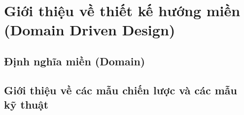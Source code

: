 \documentclass{report} %
\begin{document}
% 















% 


\section{Giới thiệu về thiết kế hướng miền (Domain Driven Design) }



\subsection{Định nghĩa miền (Domain)}

% 

\subsection{Giới thiệu về các mẫu chiến lược và các mẫu kỹ thuật}

% 
\end{document}
